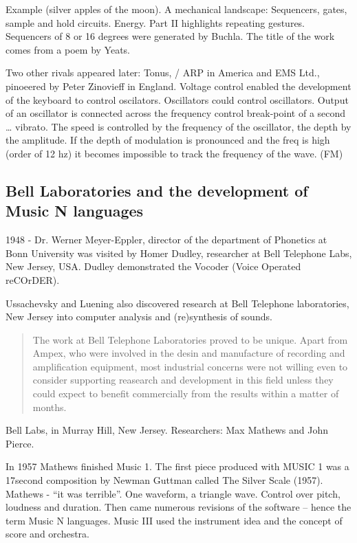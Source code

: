 Example (silver apples of the moon). A mechanical landscape: Sequencers, gates, sample and hold circuits. Energy. Part II highlights repeating gestures. Sequencers of 8 or 16 degrees were generated by Buchla. The title of the work comes from a poem by Yeats.

Two other rivals appeared later: Tonus, / ARP in America and EMS Ltd., pinoeered by Peter Zinovieff in England. Voltage control enabled the development of the keyboard to control oscilators. Oscillators could control oscillators. Output of an oscillator is connected across the frequency control break-point of a second … vibrato. The speed is controlled by the frequency of the oscillator, the depth by the amplitude. If the depth of modulation is pronounced and the freq is high (order of 12 hz) it becomes impossible to track the frequency of the wave. (FM)



\subsection{Bell Laboratories and the development of Music N languages}

1948 - Dr. Werner Meyer-Eppler, director of the department of Phonetics at Bonn University was visited by Homer Dudley, researcher at Bell Telephone Labs, New Jersey, USA. Dudley demonstrated the Vocoder (Voice Operated reCOrDER).

Ussachevsky and Luening also discovered research at Bell Telephone laboratories, New Jersey into computer analysis and (re)synthesis of sounds.

\begin{quotation}
The work at Bell Telephone Laboratories proved to be unique. Apart from Ampex, who were involved in the desin and manufacture of recording and amplification equipment, most industrial concerns were not willing even to consider supporting reasearch and development in this field unless they could expect to benefit commercially from the results within a matter of months. \citep[94]{manning2013electronic}
\end{quotation}


Bell Labs, in Murray Hill, New Jersey. Researchers: Max Mathews and John Pierce.

In 1957 Mathews finished Music 1. The first piece produced with MUSIC 1 was a 17second composition by Newman Guttman called The Silver Scale (1957). Mathews - ``it was terrible''. One waveform, a triangle wave. Control over pitch, loudness and duration. Then came numerous revisions of the software – hence the term Music N languages. Music III used the instrument idea and the concept of score and orchestra.

